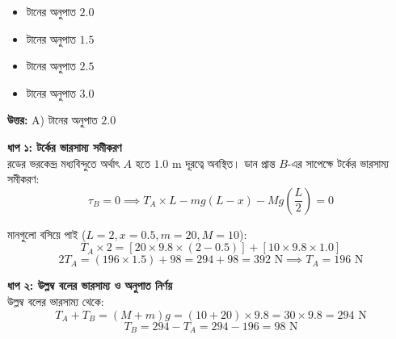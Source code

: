 \documentclass[12pt, a4paper]{article}
\begin{document}
{{\begin{center}
\end{center}
\vspace{1em}

\begin{itemize}[label={}, leftmargin=1cm, itemsep=0.5em]
    \item[\textbf{A)}] টানের অনুপাত $2.0$
    \item[\textbf{B)}] টানের অনুপাত $1.5$
    \item[\textbf{C)}] টানের অনুপাত $2.5$
    \item[\textbf{D)}] টানের অনুপাত $3.0$
\end{itemize}

\vspace{0.5em}
\begin{tcolorbox}[answerbox]
    \textbf{\color{success} উত্তর:} A) টানের অনুপাত $2.0$
\end{tcolorbox}
\vspace{1em}

\begin{tcolorbox}[solutionbox={সমাধান (Solution)}]
    \noindent
    \textbf{ধাপ ১: টর্কের ভারসাম্য সমীকরণ} \\
    রডের ভরকেন্দ্র মধ্যবিন্দুতে অর্থাৎ $A$ হতে $1.0\text{ m}$ দূরত্বে অবস্থিত। ডান প্রান্ত $B$-এর সাপেক্ষে টর্কের ভারসাম্য সমীকরণ:
    \[ \tau_B = 0 \implies T_A \times L - m g (L - x) - M g \left(\frac{L}{2}\right) = 0 \]
    
    মানগুলো বসিয়ে পাই ($L = 2, x = 0.5, m = 20, M = 10$):
    \[ T_A \times 2 = [20 \times 9.8 \times (2 - 0.5)] + [10 \times 9.8 \times 1.0] \]
    \[ 2 T_A = (196 \times 1.5) + 98 = 294 + 98 = 392\text{ N} \implies T_A = 196\text{ N} \]
    
    \vspace{0.5em}
    \noindent\textbf{ধাপ ২: উল্লম্ব বলের ভারসাম্য ও অনুপাত নির্ণয়} \\
    উল্লম্ব বলের ভারসাম্য থেকে:
    \[ T_A + T_B = (M + m) g = (10 + 20) \times 9.8 = 30 \times 9.8 = 294\text{ N} \]
    \[ T_B = 294 - T_A = 294 - 196 = 98\text{ N} \]
    

\end{tcolorbox}}}
\end{document}
